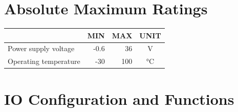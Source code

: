 \documentclass{article}
\begin{document}
\section{Absolute Maximum Ratings}
\begin{table}[H]
\begin{tabularx}{\textwidth}{|X|r r|c|}
\hline
\rowcolor{lightgray}         & MIN     & MAX     & UNIT \\ \hline
Power supply voltage         & -0.6    & 36      & V    \\ \hline
Operating temperature        & -30     & 100     & °C \\ \hline
\end{tabularx}
\label{table:abs}
\end{table}

\section{IO Configuration and Functions}
\end{document}
